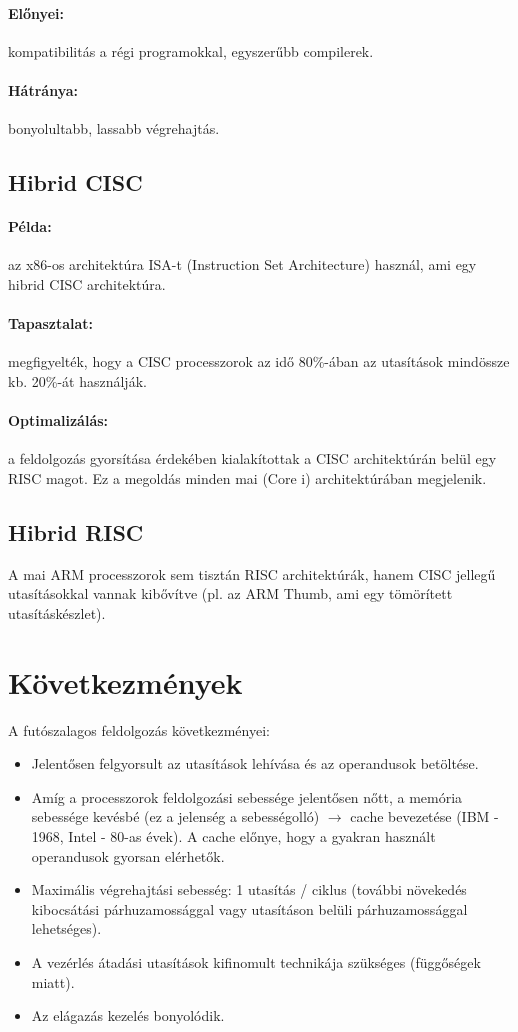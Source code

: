 \paragraph{Előnyei:} kompatibilitás a régi programokkal, egyszerűbb compilerek.
\paragraph{Hátránya:} bonyolultabb, lassabb végrehajtás.

\subsection{Hibrid CISC}
\paragraph{Példa:} az x86-os architektúra ISA-t (Instruction Set Architecture) használ, ami egy hibrid CISC architektúra.
\paragraph{Tapasztalat:} megfigyelték, hogy a CISC processzorok az idő 80\%-ában az utasítások mindössze kb. 20\%-át használják.
\paragraph{Optimalizálás:} a feldolgozás gyorsítása érdekében kialakítottak a CISC architektúrán belül egy RISC magot.
Ez a megoldás minden mai (Core i) architektúrában megjelenik.

\subsection{Hibrid RISC}
A mai ARM processzorok sem tisztán RISC architektúrák, hanem CISC jellegű utasításokkal vannak kibővítve (pl. az ARM Thumb, ami egy tömörített utasításkészlet).

\section{Következmények}
A futószalagos feldolgozás következményei:
\begin{itemize}
    \item Jelentősen felgyorsult az utasítások lehívása és az operandusok betöltése.
    \item Amíg a processzorok feldolgozási sebessége jelentősen nőtt, a memória sebessége kevésbé (ez a jelenség a sebességolló) $\rightarrow$ cache bevezetése (IBM - 1968, Intel - 80-as évek). A cache előnye, hogy a gyakran használt operandusok gyorsan elérhetők.
    \item Maximális végrehajtási sebesség: 1 utasítás / ciklus (további növekedés kibocsátási párhuzamossággal vagy utasításon belüli párhuzamossággal lehetséges).
    \item A vezérlés átadási utasítások kifinomult technikája szükséges (függőségek miatt).
    \item Az elágazás kezelés bonyolódik.
\end{itemize}

